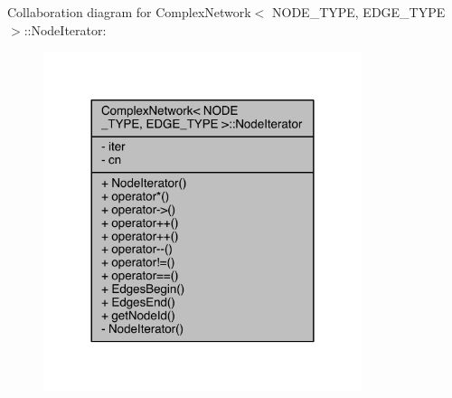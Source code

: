 Collaboration diagram for Complex\+Network$<$ N\+O\+D\+E\+\_\+\+T\+Y\+P\+E, E\+D\+G\+E\+\_\+\+T\+Y\+P\+E $>$\+:\+:Node\+Iterator\+:\nopagebreak
\begin{figure}[H]
\begin{center}
\leavevmode
\includegraphics[width=264pt]{class_complex_network_1_1_node_iterator__coll__graph}
\end{center}
\end{figure}



